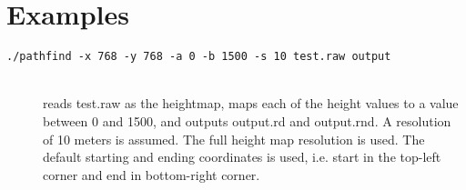 \section*{Examples}

\begin{description}
\item[\texttt{./pathfind -x 768 -y 768 -a 0 -b 1500 -s 10 test.raw output}] \hfill\\
reads test.raw as the heightmap, maps each of the height values to a value between 0 and 1500, and outputs output.rd and output.rnd. A resolution of 10 meters is assumed. The full height map resolution is used. The default starting and ending coordinates is used, i.e. start in the top-left corner and end in bottom-right corner.

\end{description}

